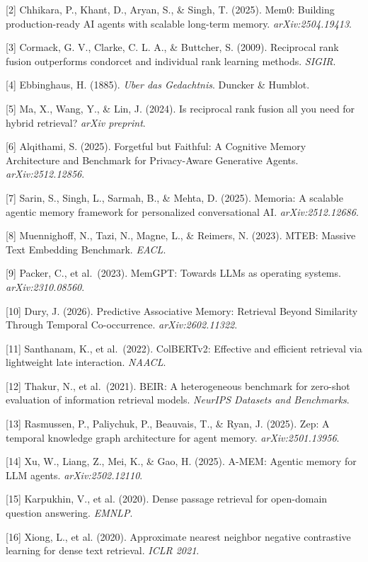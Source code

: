 \documentclass[
  11pt]{article}
\begin{document}
{[}2{]} Chhikara, P., Khant, D., Aryan, S., \& Singh, T. (2025). Mem0: Building production-ready AI agents with scalable long-term memory. \emph{arXiv:2504.19413}.

{[}3{]} Cormack, G. V., Clarke, C. L. A., \& Buttcher, S. (2009). Reciprocal rank fusion outperforms condorcet and individual rank learning methods. \emph{SIGIR}.

{[}4{]} Ebbinghaus, H. (1885). \emph{Uber das Gedachtnis}. Duncker \& Humblot.

{[}5{]} Ma, X., Wang, Y., \& Lin, J. (2024). Is reciprocal rank fusion all you need for hybrid retrieval? \emph{arXiv preprint}.

{[}6{]} Alqithami, S. (2025). Forgetful but Faithful: A Cognitive Memory Architecture and Benchmark for Privacy-Aware Generative Agents. \emph{arXiv:2512.12856}.

{[}7{]} Sarin, S., Singh, L., Sarmah, B., \& Mehta, D. (2025). Memoria: A scalable agentic memory framework for personalized conversational AI. \emph{arXiv:2512.12686}.

{[}8{]} Muennighoff, N., Tazi, N., Magne, L., \& Reimers, N. (2023). MTEB: Massive Text Embedding Benchmark. \emph{EACL}.

{[}9{]} Packer, C., et al.~(2023). MemGPT: Towards LLMs as operating systems. \emph{arXiv:2310.08560}.

{[}10{]} Dury, J. (2026). Predictive Associative Memory: Retrieval Beyond Similarity Through Temporal Co-occurrence. \emph{arXiv:2602.11322}.

{[}11{]} Santhanam, K., et al.~(2022). ColBERTv2: Effective and efficient retrieval via lightweight late interaction. \emph{NAACL}.

{[}12{]} Thakur, N., et al.~(2021). BEIR: A heterogeneous benchmark for zero-shot evaluation of information retrieval models. \emph{NeurIPS Datasets and Benchmarks}.

{[}13{]} Rasmussen, P., Paliychuk, P., Beauvais, T., \& Ryan, J. (2025). Zep: A temporal knowledge graph architecture for agent memory. \emph{arXiv:2501.13956}.

{[}14{]} Xu, W., Liang, Z., Mei, K., \& Gao, H. (2025). A-MEM: Agentic memory for LLM agents. \emph{arXiv:2502.12110}.

{[}15{]} Karpukhin, V., et al. (2020). Dense passage retrieval for open-domain question answering. \emph{EMNLP}.

{[}16{]} Xiong, L., et al. (2020). Approximate nearest neighbor negative contrastive learning for dense text retrieval. \emph{ICLR 2021}.
\end{document}
